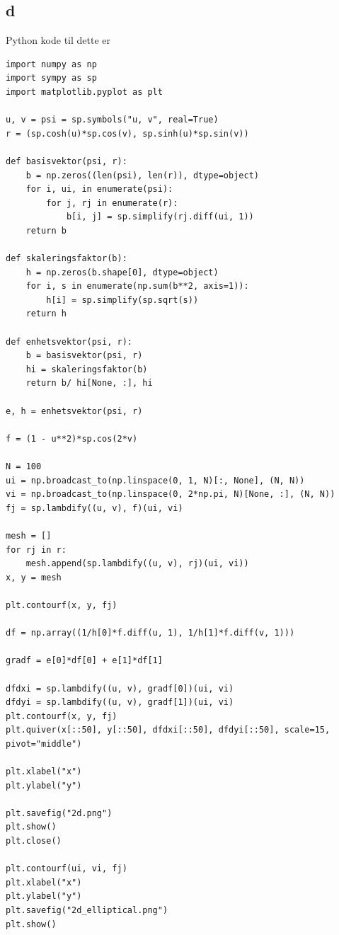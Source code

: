 \documentclass[a4paper,10pt,norsk]{article}
\begin{document}
	\subsection*{d}
	Python kode til dette er
	\begin{lstlisting}
import numpy as np
import sympy as sp
import matplotlib.pyplot as plt

u, v = psi = sp.symbols("u, v", real=True)
r = (sp.cosh(u)*sp.cos(v), sp.sinh(u)*sp.sin(v))

def basisvektor(psi, r):
    b = np.zeros((len(psi), len(r)), dtype=object)
    for i, ui, in enumerate(psi):
        for j, rj in enumerate(r):
            b[i, j] = sp.simplify(rj.diff(ui, 1))
    return b

def skaleringsfaktor(b):
    h = np.zeros(b.shape[0], dtype=object)
    for i, s in enumerate(np.sum(b**2, axis=1)):
        h[i] = sp.simplify(sp.sqrt(s))
    return h

def enhetsvektor(psi, r):
    b = basisvektor(psi, r)
    hi = skaleringsfaktor(b)
    return b/ hi[None, :], hi

e, h = enhetsvektor(psi, r)

f = (1 - u**2)*sp.cos(2*v)

N = 100
ui = np.broadcast_to(np.linspace(0, 1, N)[:, None], (N, N))
vi = np.broadcast_to(np.linspace(0, 2*np.pi, N)[None, :], (N, N))
fj = sp.lambdify((u, v), f)(ui, vi)

mesh = []
for rj in r:
    mesh.append(sp.lambdify((u, v), rj)(ui, vi))
x, y = mesh

plt.contourf(x, y, fj)

df = np.array((1/h[0]*f.diff(u, 1), 1/h[1]*f.diff(v, 1)))

gradf = e[0]*df[0] + e[1]*df[1]

dfdxi = sp.lambdify((u, v), gradf[0])(ui, vi)
dfdyi = sp.lambdify((u, v), gradf[1])(ui, vi)
plt.contourf(x, y, fj)
plt.quiver(x[::50], y[::50], dfdxi[::50], dfdyi[::50], scale=15, pivot="middle")

plt.xlabel("x")
plt.ylabel("y")

plt.savefig("2d.png")
plt.show()
plt.close()

plt.contourf(ui, vi, fj)
plt.xlabel("x")
plt.ylabel("y")
plt.savefig("2d_elliptical.png")
plt.show()
	\end{lstlisting}
	\newpage
\end{document}
